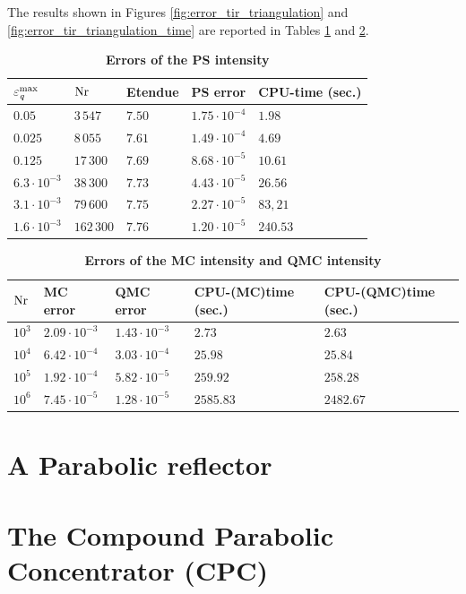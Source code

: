 The results shown in Figures \ref{fig:error_tir_triangulation} and \ref{fig:error_tir_triangulation_time} are reported in Tables \ref{tab:ps_error_triangulation} and  \ref{tab:qmc_error_triangulation}.
\begin{table}[ht] \label{tab:table_tir_triangulation}
\centering
\caption{\bf Errors of the PS intensity}
\begin{tabular}{lllll}
 \hline   $\varepsilon_{\textit{q}}^{\textrm{max}} $  & $\textrm{Nr}$ & Etendue & PS error & CPU-time (sec.) \\
  \hline 
 $0.05$ & $3\,547$   & $7.50$   &  $1.75\cdot10^{-4}$ & $1.98$\\
$0.025$  & $8\,055$    & $7.61$    & $1.49\cdot 10^{-4}$ & $4.69$ \\
$0.125$  & $17\,300$    & $7.69$  & $8.68\cdot 10^{-5}$ & $10.61$\\
 $6.3 \cdot 10^{-3}$  & $38\,300$  & $7.73$   & $4.43\cdot 10^{-5}$ & $26.56$\\
 $3.1 \cdot 10^{-3}$ & $79\,600$  & $7.75$    & $2.27\cdot 10^{-5}$ & $83,21$\\
$1.6 \cdot 10^{-3}$ & $162\,300$  & $7.76$    & $1.20\cdot 10^{-5}$ & $240.53$\\
 \hline
 \end{tabular}
 \label{tab:ps_error_triangulation}
 \end{table}
\begin{table}[h!] \label{tab:table_tir_triangulation}
\centering
\caption{\bf Errors of the MC intensity and QMC intensity}
\begin{tabular}{lllll}
 \hline  $\textrm{Nr}$\;  & MC error & QMC error & CPU-(MC)time (sec.) & CPU-(QMC)time (sec.)\\
  \hline 
 $10^3$ & $2.09\cdot 10^{-3}$  & $1.43\cdot10^{-3}$  & $2.73$  & $2.63$  \\
$10^4$  & $6.42\cdot 10^{-4}$  & $3.03\cdot 10^{-4}$  & $25.98$  & $25.84$   \\
$10^5$  & $1.92\cdot 10^{-4}$  & $5.82\cdot 10^{-5}$  & $259.92$  & $258.28$  \\
 $10^6$  & $7.45\cdot 10^{-5}$  & $1.28\cdot 10^{-5}$  & $2585.83$ & $2482.67$  \\
 \hline
 \end{tabular}
 \label{tab:qmc_error_triangulation}
 \end{table}



\section{A Parabolic reflector}

\section{The Compound Parabolic Concentrator (CPC)}
